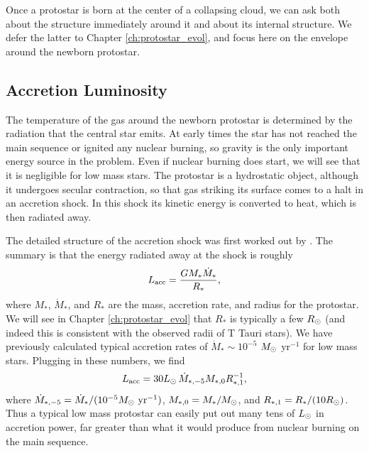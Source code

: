 Once a protostar is born at the center of a collapsing cloud, we can ask both about the structure immediately around it and about its internal structure. We defer the latter to Chapter \ref{ch:protostar_evol}, and focus here on the envelope around the newborn protostar.

\subsection{Accretion Luminosity}

The temperature of the gas around the newborn protostar is determined by the radiation that the central star emits. At early times the star has not reached the main sequence or ignited any nuclear burning, so gravity is the only important energy source in the problem. Even if nuclear burning does start, we will see that it is negligible for low mass stars. The protostar is a hydrostatic object, although it undergoes secular contraction, so that gas striking its surface comes to a halt in an accretion shock. In this shock its kinetic energy is converted to heat, which is then radiated away.

The detailed structure of the accretion shock was first worked out by \citet{stahler80a, stahler80b}. The summary is that the energy radiated away at the shock is roughly
\begin{equation}
L_{\rm acc} = \frac{G M_* \dot{M}_*}{R_*},
\end{equation}
where $M_*$, $\dot{M}_*$, and $R_*$ are the mass, accretion rate, and radius for the protostar. We will see in Chapter \ref{ch:protostar_evol} that $R_*$ is typically a few $R_{\odot}$ (and indeed this is consistent with the observed radii of T Tauri stars). We have previously calculated typical accretion rates of $\dot{M}_*\sim 10^{-5}$ $M_{\odot}$ yr$^{-1}$ for low mass stars.
Plugging in these numbers, we find
\begin{equation}
L_{\rm acc} = 30L_{\odot}\, \dot{M}_{*,-5} M_{*,0} R_{*,1}^{-1},
\end{equation}
where $\dot{M}_{*,-5}=\dot{M}_*/(10^{-5}M_{\odot}\mbox{ yr}^{-1})$, $M_{*,0}=M_*/M_{\odot}$, and $R_{*,1}=R_*/(10R_{\odot})$.
Thus a typical low mass protostar can easily put out many tens of $L_{\odot}$ in accretion power, far greater than what it would produce from nuclear burning on the main sequence. 

